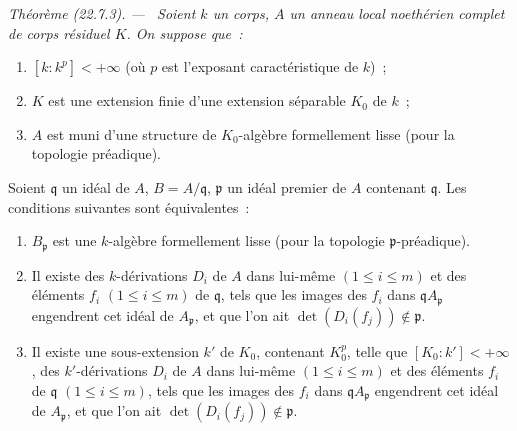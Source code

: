 \documentclass[10pt,oneside]{book}
\makeatletter
\newcommand{\setmanualcurrentlabel}[1]{\def\@currentlabel{#1}}
\newenvironment{theorem}[1][]{%
  \setmanualcurrentlabel{#1}\par\medskip\noindent\itshape Théorème (#1). ---\ }{\par}
\makeatother
\begin{document}
\begin{theorem}[22.7.3]
\label{0.22.7.3-fr}
Soient $k$ un corps, $A$ un anneau local noethérien complet de corps résiduel
$K$. On suppose que~:
\begin{enumerate}
  \item[$1^\circ$] $[k:k^p]<+\infty$ (où $p$ est l'exposant caractéristique
  de $k$)~;
  \item[$2^\circ$] $K$ est une extension finie d'une extension séparable
  $K_0$ de $k$~;
  \item[$3^\circ$] $A$ est muni d'une structure de $K_0$-algèbre formellement
  lisse (pour la topologie préadique).
\end{enumerate}
Soient $\mathfrak q$ un idéal de $A$, $B=A/\mathfrak q$, $\mathfrak p$ un
idéal premier de $A$ contenant $\mathfrak q$. Les conditions suivantes sont
équivalentes~:
\begin{enumerate}
  \item[a)] $B_{\mathfrak p}$ est une $k$-algèbre formellement lisse (pour la
  topologie $\mathfrak p$-préadique).
  \item[b)] Il existe des $k$-dérivations $D_i$ de $A$ dans lui-même
  $(1\leq i\leq m)$ et des éléments $f_i$ $(1\leq i\leq m)$ de
  $\mathfrak q$, tels que les images des $f_i$ dans
  $\mathfrak qA_{\mathfrak p}$ engendrent cet idéal de $A_{\mathfrak p}$, et
  que l'on ait $\det(D_i(f_j))\notin\mathfrak p$.
  \item[b')] Il existe une sous-extension $k'$ de $K_0$, contenant $K_0^p$,
  telle que $[K_0:k']<+\infty$, des $k'$-dérivations $D_i$ de $A$ dans
  lui-même $(1\leq i\leq m)$ et des éléments $f_i$ de $\mathfrak q$
  $(1\leq i\leq m)$, tels que les images des $f_i$ dans
  $\mathfrak qA_{\mathfrak p}$ engendrent cet idéal de $A_{\mathfrak p}$, et
  que l'on ait $\det(D_i(f_j))\notin\mathfrak p$.
\end{enumerate}
\end{theorem}
\end{document}
